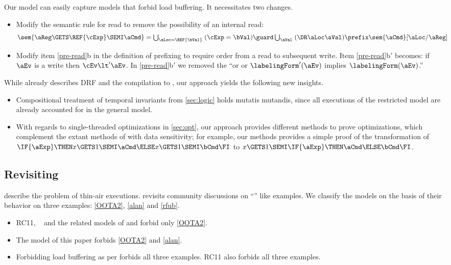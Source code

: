 Our model can easily capture models that forbid load buffering.  It
necessitates two changes.
\begin{itemize}
\item Modify the semantic rule for read to remove the possibility of an
  internal read:
  \begin{align*}
    \sem{\aReg\GETS\REF{\cExp}\SEMI \aCmd} & =
    \textstyle\bigcup_{\aLoc=\REF{\bVal}}\; ({\cExp}=\bVal) \guard \textstyle\bigcup_\aVal\; (\DR\aLoc\aVal) \prefix \sem{\aCmd}[\aLoc/\aReg] 
  \end{align*}
\item Modify item \ref{pre-read}b in the definition of prefixing to require
  order from a read to subsequent write.  Item \ref{pre-read}b$'$ becomes: if
  $\aEv$ is a write then $\cEv\lt'\aEv$.  In \ref{pre-read}b$'$ we removed
  the ``or or $\labelingForm'(\aEv)$ implies $\labelingForm(\aEv)$.''
\end{itemize}

While \citet{Dolan:2018:BDR:3192366.3192421} already describes DRF and the
compilation to \armeight, our approach yields the following new insights.
\begin{itemize}
\item Compositional treatment of temporal invariants
  from \textsection\ref{sec:logic} holds mutatis mutandis, since all
  executions of the restricted model are already accounted for in the general
  model.

\item With regards to single-threaded optimizations in
  \textsection\ref{sec:opt}, our approach provides different methods to prove
  optimizations, which complement the extant methods of
  \citet{Dolan:2018:BDR:3192366.3192421} with data sensitivity; for example,
  our methods provides a simple proof of the transformation of
  $\IF{\aExp}\THEN x \GETS 1 \SEMI \aCmd \ELSE x\GETS 1 \SEMI \bCmd\FI$ to
  $x \GETS 1 \SEMI \IF{\aExp}\THEN \aCmd \ELSE \bCmd\FI$.

\end{itemize}

\subsection{Revisiting \oota}
\citet{DBLP:conf/esop/BattyMNPS15} describe the problem of thin-air
executions. \citet{BoehmOOTA} revisits community discussions on ``\oota''
like examples.  We classify the models on the basis of their behavior on
three examples: \eqref{OOTA2}, \eqref{alan} and \eqref{rfub}.
\begin{itemize}
\item RC11\cite{DBLP:conf/pldi/LahavVKHD17}, \jmm\ 
  \cite{Manson:2005:JMM:1047659.1040336} and the related models of
  \citet{DBLP:conf/esop/JagadeesanPR10} and \citet{DBLP:conf/popl/KangHLVD17}
  forbid only \eqref{OOTA2}.
\item The model of this paper forbids \eqref{OOTA2} and \eqref{alan}.
\item Forbidding load buffering as per
  \citep{Dolan:2018:BDR:3192366.3192421,BoehmOOTA} forbids all three
  examples.  RC11\cite{DBLP:conf/pldi/LahavVKHD17} also forbids all three
  examples.
\end{itemize}

